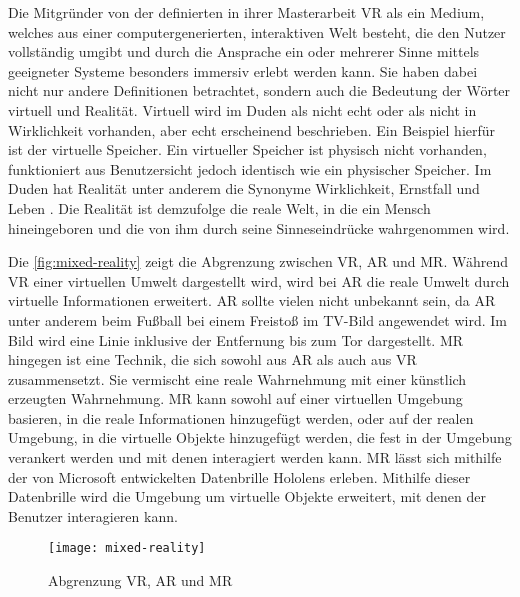 Die Mitgründer von der   definierten in ihrer Masterarbeit \ac{VR} als \glqq ein Medium, welches aus einer computergenerierten, interaktiven Welt besteht, die den Nutzer vollständig umgibt und durch die Ansprache ein oder mehrerer Sinne mittels geeigneter Systeme besonders immersiv erlebt werden kann\grqq \cite{omnia.2017}. Sie haben dabei nicht nur andere Definitionen betrachtet, sondern auch die Bedeutung der Wörter virtuell und Realität. Virtuell wird im Duden als \glqq nicht echt \grqq \cite{DudenVirtuell} oder als \glqq nicht in Wirklichkeit vorhanden, aber echt erscheinend\grqq \cite{DudenVirtuell} beschrieben. Ein Beispiel hierfür ist der virtuelle Speicher. Ein virtueller Speicher ist physisch nicht vorhanden, funktioniert aus Benutzersicht jedoch identisch wie ein physischer Speicher. Im Duden hat Realität unter anderem die Synonyme Wirklichkeit, Ernstfall und Leben \cite{DudenRealitaet}. Die Realität ist demzufolge \glqq die reale Welt, in die ein Mensch hineingeboren und die von ihm durch seine Sinneseindrücke wahrgenommen wird\grqq \cite{omnia.2017}.

Die \autoref{fig:mixed-reality} zeigt die Abgrenzung zwischen \ac{VR}, \ac{AR} und \ac{MR}. Während \ac{VR} einer virtuellen Umwelt dargestellt wird, wird bei \ac{AR} die reale Umwelt durch virtuelle Informationen erweitert. \ac{AR} sollte vielen nicht unbekannt sein, da \ac{AR} unter anderem beim Fußball bei einem Freistoß im TV-Bild angewendet wird. Im Bild wird eine Linie inklusive der Entfernung bis zum Tor dargestellt. \ac{MR} hingegen ist eine Technik, die sich sowohl aus \ac{AR} als auch aus \ac{VR} zusammensetzt. Sie vermischt eine reale Wahrnehmung mit einer künstlich erzeugten Wahrnehmung. \ac{MR} kann sowohl auf einer virtuellen Umgebung basieren, in die reale Informationen hinzugefügt werden, oder auf der realen Umgebung, in die virtuelle Objekte hinzugefügt werden, die fest in der Umgebung verankert werden und mit denen interagiert werden kann. \ac{MR} lässt sich mithilfe der von Microsoft entwickelten Datenbrille Hololens erleben. Mithilfe dieser Datenbrille wird die Umgebung um virtuelle Objekte erweitert, mit denen der Benutzer interagieren kann.

\begin{figure}[!htbp]
	\centering
	\texttt{[image: mixed-reality]}
	\caption[Abgrenzung VR, AR und MR]{Abgrenzung VR, AR und MR \cite[S. 20]{BurofurTechnikfolgenAbschatzungbeimDeutschenBundestag.2019}}
	\label{fig:mixed-reality}
\end{figure}


